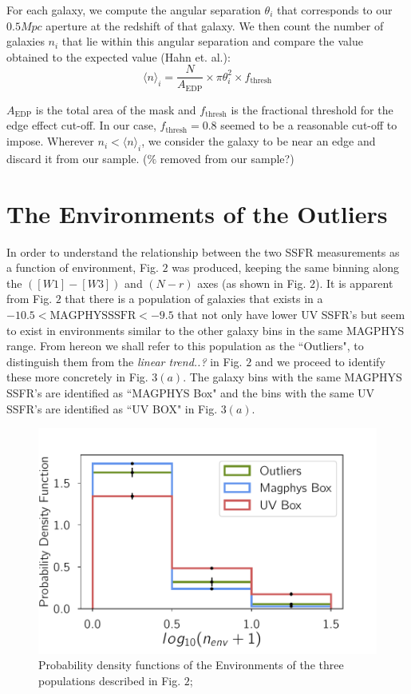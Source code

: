 \documentclass[iop]{emulateapj}
\begin{document}
For each galaxy, we compute the angular separation $\theta_{i}$ that corresponds to our $0.5 Mpc$ aperture at the redshift of that galaxy. We then count the number of galaxies $n_{i}$ that lie within this angular separation and compare the value obtained to the expected value (Hahn et. al.):
$$\big \langle n \big \rangle _{i} = \frac{N}{A_{\mathrm{EDP}}} \times \pi \theta_{i}^{2} \times f_{\mathrm{thresh}} $$


$A_{\mathrm{EDP}}$ is the total area of the mask and $f_{\mathrm{thresh}}$ is the fractional threshold for the edge effect cut-off. In our case, $f_{\mathrm{thresh}} = 0.8$ seemed to be a reasonable cut-off to impose. Wherever $n_{i} < \big \langle n \big \rangle _{i} $, we consider the galaxy to be near an edge and discard it from our sample. ($\%$ removed from our sample?)


\section{The Environments of the Outliers}

In order to understand the relationship between the two SSFR measurements as a function of environment, Fig. $2$ was produced, keeping the same binning along the $([W1]-[W3])$ and $(N-r)$ axes (as shown in Fig. $2$). It is apparent from Fig. $2$ that there is a population of galaxies that exists in a $ -10.5 < \mathrm{MAGPHYS} \mathrm{SSFR} < -9.5$ that not only have lower UV SSFR's but seem to exist in environments similar to the other galaxy bins in the same MAGPHYS range. From hereon we shall refer to this population as the ``Outliers", to distinguish them from the \emph{linear trend..?} in Fig. $2$ and we proceed to identify these more concretely in Fig. $3(a)$. The galaxy bins with the same MAGPHYS SSFR's are identified as ``MAGPHYS Box" and the bins with the same UV SSFR's are identified as ``UV BOX" in Fig. $3(a)$. \\

\begin{figure}
	\centering
		\includegraphics[width = 9 cm, height = 6.0 cm]{jk_plot.pdf}
	\caption{Probability density functions of the Environments of the three populations described in Fig. $2$; } 
\end{figure}
\end{document}

